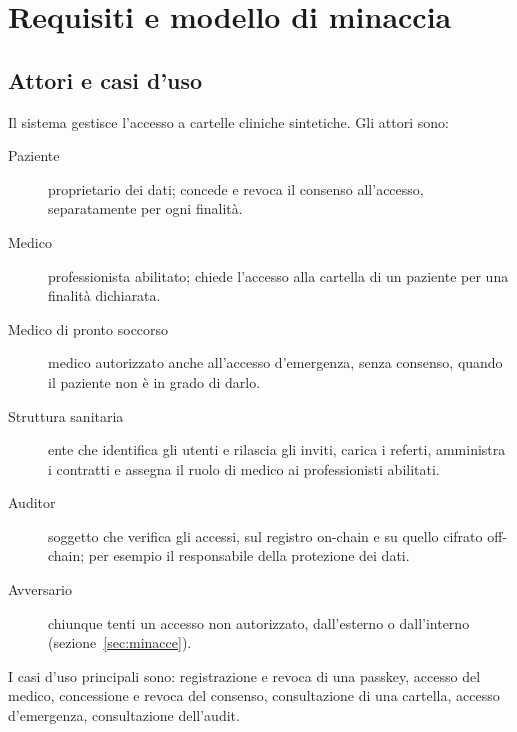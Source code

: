 \section{Requisiti e modello di minaccia}

\subsection{Attori e casi d'uso}
Il sistema gestisce l'accesso a cartelle cliniche sintetiche. Gli attori sono:

\begin{description}
  \item[Paziente] proprietario dei dati; concede e revoca il consenso all'accesso, separatamente per ogni finalità.
  \item[Medico] professionista abilitato; chiede l'accesso alla cartella di un paziente per una finalità dichiarata.
  \item[Medico di pronto soccorso] medico autorizzato anche all'accesso d'emergenza, senza consenso, quando il paziente non è in grado di darlo.
  \item[Struttura sanitaria] ente che identifica gli utenti e rilascia gli inviti, carica i referti, amministra i contratti e assegna il ruolo di medico ai professionisti abilitati.
  \item[Auditor] soggetto che verifica gli accessi, sul registro on-chain e su quello cifrato off-chain; per esempio il responsabile della protezione dei dati.
  \item[Avversario] chiunque tenti un accesso non autorizzato, dall'esterno o dall'interno (sezione~\ref{sec:minacce}).
\end{description}

I casi d'uso principali sono: registrazione e revoca di una passkey, accesso del medico, concessione e revoca del consenso, consultazione di una cartella, accesso d'emergenza, consultazione dell'audit.

